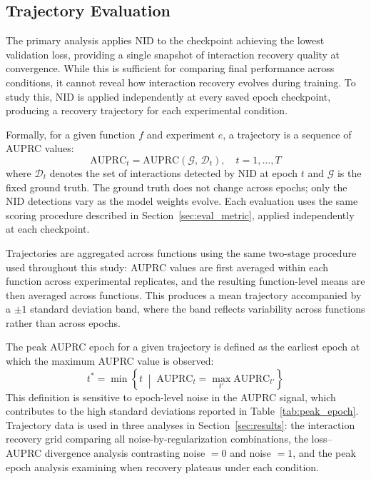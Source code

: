 \documentclass{article}
\begin{document}
\subsection{Trajectory Evaluation}
\label{sec:trajectory_eval}

The primary analysis applies NID to the checkpoint achieving the lowest 
validation loss, providing a single snapshot of interaction recovery quality 
at convergence. While this is sufficient for comparing final performance 
across conditions, it cannot reveal how interaction recovery evolves during 
training. To study this, NID is applied independently at every saved epoch 
checkpoint, producing a recovery trajectory for each experimental condition.

Formally, for a given function $f$ and experiment $e$, a trajectory is a 
sequence of AUPRC values:
\begin{equation}
    \text{AUPRC}_t = \text{AUPRC}\!\left(\mathcal{G},\, 
    \mathcal{D}_t\right), \quad t = 1, \dots, T
\end{equation}
where $\mathcal{D}_t$ denotes the set of interactions detected by NID at 
epoch $t$ and $\mathcal{G}$ is the fixed ground truth. The ground truth does 
not change across epochs; only the NID detections vary as the model weights 
evolve. Each evaluation uses the same scoring procedure described in 
Section~\ref{sec:eval_metric}, applied independently at each checkpoint.

Trajectories are aggregated across functions using the same two-stage 
procedure used throughout this study: AUPRC values are first averaged within 
each function across experimental replicates, and the resulting function-level 
means are then averaged across functions. This produces a mean trajectory 
accompanied by a $\pm 1$ standard deviation band, where the band reflects 
variability across functions rather than across epochs.

The peak AUPRC epoch for a given trajectory is defined as the earliest epoch 
at which the maximum AUPRC value is observed:
\begin{equation}
    t^* = \min \left\{ t \;\middle|\; \text{AUPRC}_t = 
    \max_{t'} \text{AUPRC}_{t'} \right\}
\end{equation}
This definition is sensitive to epoch-level noise in the AUPRC signal, which 
contributes to the high standard deviations reported in 
Table~\ref{tab:peak_epoch}. Trajectory data is used in three analyses in 
Section~\ref{sec:results}: the interaction recovery grid comparing all 
noise-by-regularization combinations, the loss--AUPRC divergence analysis 
contrasting noise $= 0$ and noise $= 1$, and the peak epoch analysis 
examining when recovery plateaus under each condition.
\end{document}
